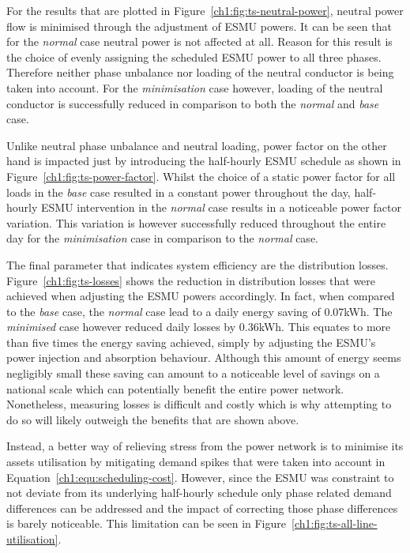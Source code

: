 

For the results that are plotted in Figure~\ref{ch1:fig:ts-neutral-power}, neutral power flow is minimised through the adjustment of ESMU powers.
It can be seen that for the \textit{normal} case neutral power is not affected at all.
Reason for this result is the choice of evenly assigning the scheduled ESMU power to all three phases.
Therefore neither phase unbalance nor loading of the neutral conductor is being taken into account.
For the \textit{minimisation} case however, loading of the neutral conductor is successfully reduced in comparison to both the \textit{normal} and \textit{base} case.



Unlike neutral phase unbalance and neutral loading, power factor on the other hand is impacted just by introducing the half-hourly ESMU schedule as shown in Figure~\ref{ch1:fig:ts-power-factor}.
Whilst the choice of a static power factor for all loads in the \textit{base} case resulted in a constant power throughout the day, half-hourly ESMU intervention in the \textit{normal} case results in a noticeable power factor variation.
This variation is however successfully reduced throughout the entire day for the \textit{minimisation} case in comparison to the \textit{normal} case.



The final parameter that indicates system efficiency are the distribution losses.
Figure~\ref{ch1:fig:ts-losses} shows the reduction in distribution losses that were achieved when adjusting the ESMU powers accordingly.
In fact, when compared to the \textit{base} case, the \textit{normal} case lead to a daily energy saving of 0.07kWh.
The \textit{minimised} case however reduced daily losses by 0.36kWh.
This equates to more than five times the energy saving achieved, simply by adjusting the ESMU's power injection and absorption behaviour.
Although this amount of energy seems negligibly small these saving can amount to a noticeable level of savings on a national scale which can potentially benefit the entire power network.
Nonetheless, measuring losses is difficult and costly which is why attempting to do so will likely outweigh the benefits that are shown above.

Instead, a better way of relieving stress from the power network is to minimise its assets utilisation by mitigating demand spikes that were taken into account in Equation~\ref{ch1:equ:scheduling-cost}.
However, since the ESMU was constraint to not deviate from its underlying half-hourly schedule only phase related demand differences can be addressed and the impact of correcting those phase differences is barely noticeable.
This limitation can be seen in Figure~\ref{ch1:fig:ts-all-line-utilisation}.

